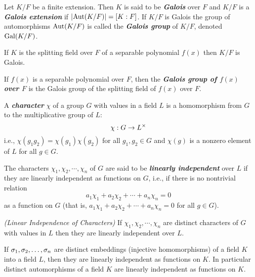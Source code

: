 \nl

\begin{defn}
Let $K/F$ be a finite extension. Then $K$ is said to be \textit{\textbf{Galois}} over $F$ and $K/F$ is a \textit{\textbf{Galois extension}} if $|\text{Aut}(K/F)| = [K:F]$. If $K/F$ is Galois the group of automorphisms $\text{Aut}(K/F)$ is called the \textit{\textbf{Galois group}} of $K/F$, denoted $\text{Gal}(K/F)$.
\end{defn}

\nl

\begin{cor}
If $K$ is the splitting field over $F$ of a separable polynomial $f(x)$ then $K/F$ is Galois.
\end{cor}

\nl

\begin{defn}
If $f(x)$ is a separable polynomial over $F$, then the \textit{\textbf{Galois group of $f(x)$ over $F$}} is the Galois group of the splitting field of $f(x)$ over $F$.
\end{defn}

\nl

\begin{defn}
A \textit{\textbf{character}} $\chi$ of a group $G$ with values in a field $L$ is a homomorphism from $G$ to the multiplicative group of $L$:
\[\chi: G\rightarrow L^\times\]
i.e., $\chi(g_1g_2) = \chi(g_1)\chi(g_2)$ for all $g_1,g_2\in G$ and $\chi(g)$ is a nonzero element of $L$ for all $g\in G$.
\end{defn}

\nl

\begin{defn}
The characters $\chi_1, \chi_2, \cdots, \chi_n$ of $G$ are said to be \textit{\textbf{linearly independent}} over $L$ if they are linearly independent as functions on $G$, i.e., if there is no nontrivial relation
\[a_1\chi_1 + a_2\chi_2 + \cdots + a_n\chi_n = 0\]
as a function on $G$ (that is, $a_1\chi_1 + a_2\chi_2 + \cdots + a_n\chi_n = 0$ for all $g\in G$).
\end{defn}

\nl

\begin{thm}\textit{(Linear Independence of Characters)}
If $\chi_1, \chi_2, \cdots, \chi_n$ are distinct characters of $G$ with values in $L$ then they are linearly independent over $L$.
\end{thm}

\nl

\begin{cor}
If $\sigma_1, \sigma_2, \ldots, \sigma_n$ are distinct embeddings (injective homomorphisms) of a field $K$ into a field $L$, then they are linearly independent as functions on $K$. In particular distinct automorphisms of a field $K$ are linearly independent as functions on $K$.
\end{cor}

